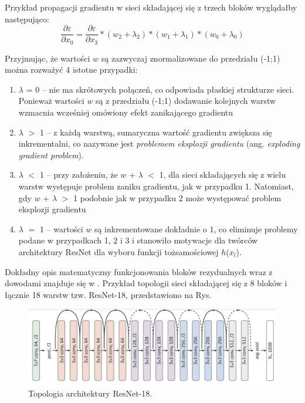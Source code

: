 Przykład propagacji gradientu w sieci składającej się z trzech bloków wyglądałby następująco:
\begin{equation}
\frac{\partial \varepsilon}{\partial x_0} =  \frac{\partial \varepsilon}{\partial x_3}*(w_2+\lambda_2)*(w_1+\lambda_1)*(w_0+\lambda_0)
\end{equation}

Przyjmując, że wartości $w$ są zazwyczaj znormalizowane do przedziału (-1;1) można rozważyć 4 istotne przypadki:
\begin{enumerate}
	\item $\lambda$ = 0 -- nie ma skrótowych połączeń, co odpowiada płaskiej strukturze sieci. Ponieważ wartości $w$ są z przedziału (-1;1) dodawanie kolejnych warstw wzmacnia wcześniej omówiony efekt zanikającego gradientu
	\item $\lambda$ $>$ 1 -- z każdą warstwą, sumaryczna wartość gradientu zwiększa się inkrementalni, co nazywane jest \textit{problemem eksplozji gradientu} (ang. \textit{exploding gradient problem}).
	\item $\lambda$ $<$ 1 -- przy założeniu, że $w$ + $\lambda$ $<$ 1, dla sieci składających się z wielu warstw występuje problem zaniku gradientu, jak w przypadku 1. Natomiast, gdy $w$ + $\lambda$ $>$ 1 podobnie jak w przypadku 2 może występować problem eksplozji gradientu
	\item $\lambda$ $=$ 1 -- wartości $w$ są inkrementowane dokładnie o 1, co eliminuje problemy podane w przypadkach 1, 2 i 3 i stanowiło motywacje dla twórców architektury ResNet dla wyboru funkcji tożsamościowej $h$($x_l$).
\end{enumerate}

Dokładny opis matematyczny funkcjonowania bloków rezydualnych wraz z dowodami znajduje się w \cite{DBLP:journals/corr/HeZR016}. Przykład topologii sieci składającej się z 8 bloków i łącznie 18 warstw tzw. ResNet-18, przedstawiono na Rys.
\begin{figure}[h!]
	\centering
	\includegraphics[width=1\textwidth]{figures/ResNet.png}
	\caption{Topologia architektury ResNet-18.}
	\label{ResNetBlock}
\end{figure} 

